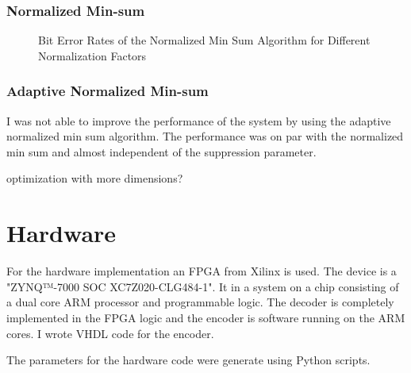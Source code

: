 \subsubsection{Normalized Min-sum}

\begin{figure}
    \centering

    \caption{Bit Error Rates of the Normalized Min Sum Algorithm for Different Normalization Factors}
    \label{min_sum_base}
\end{figure}

\subsubsection{Adaptive Normalized Min-sum}
I was not able to improve the performance of the system by using the adaptive normalized min sum algorithm. The performance was on par with the normalized min sum and almost independent of the suppression parameter. 

optimization with more dimensions?

\section{Hardware}
For the hardware implementation an FPGA from Xilinx is used. The device is a "ZYNQ™-7000 SOC XC7Z020-CLG484-1". It in a system on a chip consisting of a dual core ARM processor and programmable logic. The decoder is completely implemented in the FPGA logic and the encoder is software running on the ARM cores. I wrote VHDL code for the encoder.

The parameters for the hardware code were generate using Python scripts.

